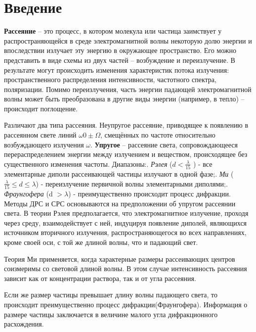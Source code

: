 \documentclass{article}
\begin{document}
\section{Введение}\;
\par \textbf{Рассеяние} – это процесс, в котором молекула или частица заимствует у распространяющейся в среде электромагнитной волны некоторую долю энергии и впоследствии излучает эту энергию в окружающее пространство. Его можно представить в виде схемы из двух частей – возбуждение и переизлучение.
В результате могут происходить изменения характеристик потока излучения: пространственного распределения интенсивности, частотного спектра, поляризации. Помимо переизлучения, часть энергии падающей электромагнитной волны может быть преобразована в другие виды энергии (например, в тепло) – происходит поглощение.

Различают два типа рассеяния.
Неупругое рассеяние, приводящее к появлению в рассеянном свете линий $\omega0 \pm \Omega$, смещённых по частоте относительно возбуждающего излучения $\omega$. \textbf{Упругое} – рассеяние света, сопровождающееся перераспределением энергии
между излучением и веществом, происходящее без существенного изменения частоты. 
Диапазоны:. \textit{Рэлея} ($d < \frac{\lambda}{15}$ ) - все элементарные диполи рассеивающей частицы излучают в одной фазе;. \textit{Ми} ($\frac{\lambda}{15} \leq d \leq \lambda $) - переизлучение первичной
волны элементарными диполями;. \textit{Фраунгофера} (d $> \lambda$) - преимущественно происходит процесс дифракции.
Методы ДРС и СРС основываются на предположении об упругом рассеянии света.
В теории Рэлея предполагается, что электромагнитное излучение, проходя через среду, взаимодействует с ней, индуцируя появление диполей, являющихся источником вторичного излучения, распространяющегося во всех направлениях, кроме своей оси, с той же длиной волны, что и падающий свет.

Теория Ми применяется, когда характерные размеры рассеивающих центров соизмеримы со световой длиной волны. В этом случае интенсивность рассеяния зависит как от концентрации раствора, так и от угла рассеяния.

Если же размер частицы превышает длину волны падающего света, то происходит преимущественно процесс дифракции(Фраунгофера). Информация о размере частицы заключается в величине малого угла дифракционного расхождения.
\end{document}
